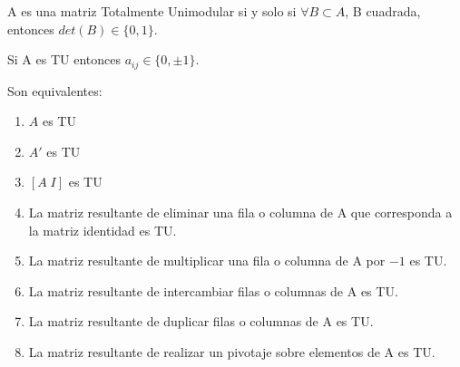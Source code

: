 \documentclass[PM.tex]{subfiles}
\begin{document}
\begin{defi}
A es una matriz Totalmente Unimodular si y solo si $\forall B\subset A$, B cuadrada, entonces $det(B)\in\{0,1\}$. 
\end{defi}
\begin{nota}
Si A es TU entonces $a_{ij}\in\{0,\pm1\}$.
\end{nota}
\begin{theorem}
Son equivalentes:
\begin{enumerate}
\item $A$ es TU
\item $A'$ es TU
\item $[A\;I]$ es TU
\item La matriz resultante de eliminar una fila o columna de A que corresponda a la matriz identidad es TU.
\item La matriz resultante de multiplicar una fila o columna de A por $-1$ es TU.
\item La matriz resultante de intercambiar filas o columnas de A es TU.
\item La matriz resultante de duplicar filas o columnas de A es TU.
\item La matriz resultante de realizar un pivotaje sobre elementos de A es TU.
\end{enumerate}
\end{theorem}
\end{document}
